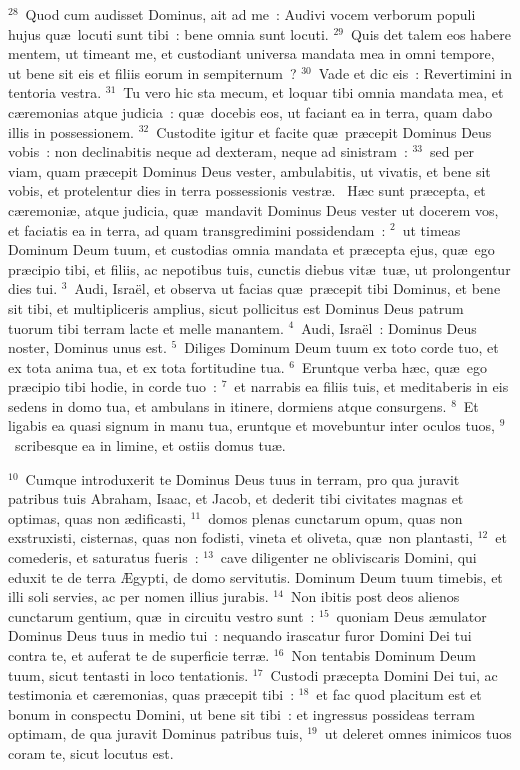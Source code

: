 ${}^{28}$~Quod cum audisset Dominus, ait ad me~: Audivi vocem verborum populi hujus qu\ae\ locuti sunt tibi~: bene omnia sunt locuti.
${}^{29}$~Quis det talem eos habere mentem, ut timeant me, et custodiant universa mandata mea in omni tempore, ut bene sit eis et filiis eorum in sempiternum~?
${}^{30}$~Vade et dic eis~: Revertimini in tentoria vestra.
${}^{31}$~Tu vero hic sta mecum, et loquar tibi omnia mandata mea, et c\ae remonias atque judicia~: qu\ae\ docebis eos, ut faciant ea in terra, quam dabo illis in possessionem.
${}^{32}$~Custodite igitur et facite qu\ae\ pr\ae cepit Dominus Deus vobis~: non declinabitis neque ad dexteram, neque ad sinistram~:
${}^{33}$~sed per viam, quam pr\ae cepit Dominus Deus vester, ambulabitis, ut vivatis, et bene sit vobis, et protelentur dies in terra possessionis vestr\ae .
~\lettrine[lines=10,image=true,loversize=0.05,lraise=-0.03]{H}{}\ae c sunt pr\ae cepta, et c\ae remoni\ae , atque judicia, qu\ae\ mandavit Dominus Deus vester ut docerem vos, et faciatis ea in terra, ad quam transgredimini possidendam~:
${}^{2}$~ut timeas Dominum Deum tuum, et custodias omnia mandata et pr\ae cepta ejus, qu\ae\ ego pr\ae cipio tibi, et filiis, ac nepotibus tuis, cunctis diebus vit\ae\ tu\ae , ut prolongentur dies tui.
${}^{3}$~Audi, Isra\"el, et observa ut facias qu\ae\ pr\ae cepit tibi Dominus, et bene sit tibi, et multipliceris amplius, sicut pollicitus est Dominus Deus patrum tuorum tibi terram lacte et melle manantem.
${}^{4}$~Audi, Isra\"el~: Dominus Deus noster, Dominus unus est.
${}^{5}$~Diliges Dominum Deum tuum ex toto corde tuo, et ex tota anima tua, et ex tota fortitudine tua.
${}^{6}$~Eruntque verba h\ae c, qu\ae\ ego pr\ae cipio tibi hodie, in corde tuo~:
${}^{7}$~et narrabis ea filiis tuis, et meditaberis in eis sedens in domo tua, et ambulans in itinere, dormiens atque consurgens.
${}^{8}$~Et ligabis ea quasi signum in manu tua, eruntque et movebuntur inter oculos tuos,
${}^{9}$~scribesque ea in limine, et ostiis domus tu\ae .


${}^{10}$~Cumque introduxerit te Dominus Deus tuus in terram, pro qua juravit patribus tuis Abraham, Isaac, et Jacob, et dederit tibi civitates magnas et optimas, quas non \ae dificasti,
${}^{11}$~domos plenas cunctarum opum, quas non exstruxisti, cisternas, quas non fodisti, vineta et oliveta, qu\ae\ non plantasti,
${}^{12}$~et comederis, et saturatus fueris~:
${}^{13}$~cave diligenter ne obliviscaris Domini, qui eduxit te de terra \AE gypti, de domo servitutis. Dominum Deum tuum timebis, et illi soli servies, ac per nomen illius jurabis.
${}^{14}$~Non ibitis post deos alienos cunctarum gentium, qu\ae\ in circuitu vestro sunt~:
${}^{15}$~quoniam Deus \ae mulator Dominus Deus tuus in medio tui~: nequando irascatur furor Domini Dei tui contra te, et auferat te de superficie terr\ae .
${}^{16}$~Non tentabis Dominum Deum tuum, sicut tentasti in loco tentationis.
${}^{17}$~Custodi pr\ae cepta Domini Dei tui, ac testimonia et c\ae remonias, quas pr\ae cepit tibi~:
${}^{18}$~et fac quod placitum est et bonum in conspectu Domini, ut bene sit tibi~: et ingressus possideas terram optimam, de qua juravit Dominus patribus tuis,
${}^{19}$~ut deleret omnes inimicos tuos coram te, sicut locutus est.


